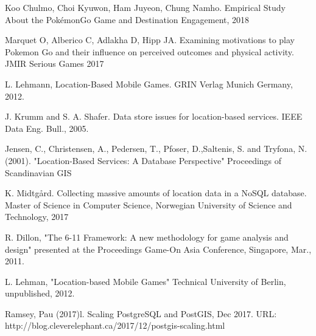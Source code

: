 \documentclass[conference]{IEEEtran}
\begin{document}
\begin{thebibliography}{1}
  
Koo Chulmo, Choi Kyuwon, Ham Juyeon, Chung Namho. Empirical Study About the PokémonGo Game and Destination Engagement, 2018

Marquet O, Alberico C, Adlakha D, Hipp JA. Examining motivations to play Pokemon Go and their influence on perceived
outcomes and physical activity. JMIR Serious Games 2017

L. Lehmann, Location-Based Mobile Games. GRIN Verlag Munich Germany, 2012.

J. Krumm and S. A. Shafer. Data store issues for location-based services. IEEE Data Eng. Bull., 2005.

Jensen, C., Christensen, A., Pedersen, T., Pfoser, D.,Saltenis, S. and Tryfona, N. (2001). "Location-Based Services: A Database Perspective" Proceedings of Scandinavian GIS

K. Midtgård. Collecting massive amounts of location data in a NoSQL database. Master of Science in Computer Science, Norwegian University of Science and Technology, 2017

R. Dillon, "The 6-11 Framework: A new methodology for game analysis and design" presented at the Proceedings Game-On Asia Conference, Singapore, Mar., 2011.

L. Lehman, "Location-based Mobile Games" Technical University of Berlin, unpublished, 2012.

Ramsey, Pau (2017)l. Scaling PostgreSQL and PostGIS, Dec 2017. URL: http://blog.cleverelephant.ca/2017/12/postgis-scaling.html

\end{thebibliography}
\end{document}
